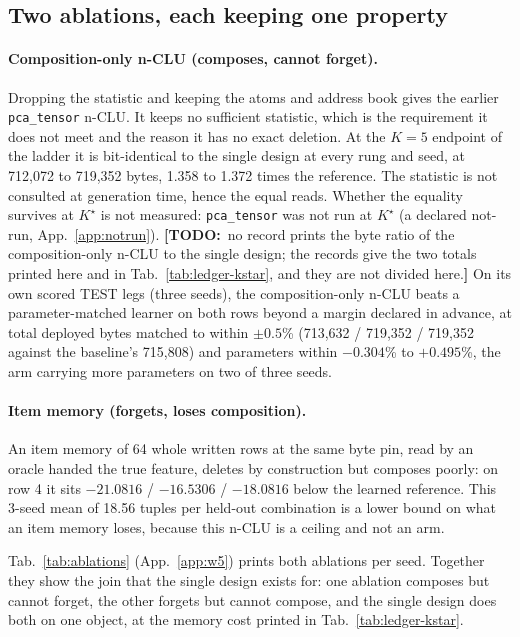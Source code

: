 \documentclass{article} %
\newcommand{\TODO}[1]{{\color{orange}\textbf{[TODO:}~#1\textbf{]}}}
\newcommand{\Kstar}{\ensuremath{K^{\star}}}
\begin{document}
\subsection{Two ablations, each keeping one property}
\label{sec:ablations}

\paragraph{Composition-only n-CLU (composes, cannot forget).} Dropping the statistic and keeping the atoms and address book gives the earlier \texttt{pca\_tensor} n-CLU. It keeps no
sufficient statistic, which is the requirement it does not meet and the reason it has no exact
deletion. At the $K=5$ endpoint of the ladder it is bit-identical to the single design at every rung and seed, at 712,072 to 719,352 bytes, 1.358 to 1.372 times the reference.
The statistic is not consulted at generation time, hence the equal reads. Whether the
equality survives at $\Kstar$ is not measured: \texttt{pca\_tensor} was not run at
$\Kstar$ (a declared not-run, App.~\ref{app:notrun}). \TODO{no record prints the byte ratio of the composition-only n-CLU to the single design;
the records give the two totals printed here and in Tab.~\ref{tab:ledger-kstar}, and they are
not divided here.}
On its own scored TEST legs (three seeds), the composition-only n-CLU beats a parameter-matched
learner on both rows beyond a margin declared in advance, at total deployed bytes matched to within $\pm0.5$\% (713,632 / 719,352 / 719,352 against the baseline's 715,808) and parameters within $-0.304$\% to $+0.495$\%, the arm carrying more parameters on two of three seeds.

\paragraph{Item memory (forgets, loses composition).} An item memory of 64 whole written rows at
the same byte pin, read by an oracle handed the true feature, deletes by construction but
composes poorly: on row 4 it sits $-21.0816$ / $-16.5306$ / $-18.0816$ below the learned
reference. This 3-seed mean of 18.56 tuples per held-out combination is a lower bound on what an item memory
loses, because this n-CLU is a ceiling and not an arm. %

Tab.~\ref{tab:ablations} (App.~\ref{app:w5}) prints both ablations per seed. Together they
show the join that the single design exists for: one ablation composes but cannot forget, the
other forgets but cannot compose, and the single design does both on one object, at the memory
cost printed in Tab.~\ref{tab:ledger-kstar}.
\end{document}
